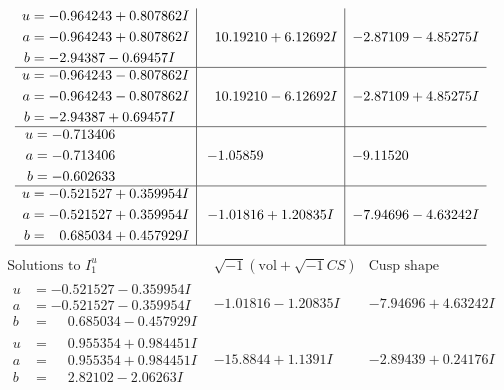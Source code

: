 \documentclass[1p]{elsarticle_modified}
\theoremstyle{definition}
\newcommand{\I}{\sqrt{-1}}
\begin{document}
$$\begin{array}{c|c|c}
\begin{aligned}
u &= -0.964243 + 0.807862 I \\
a &= -0.964243 + 0.807862 I \\
b &= -2.94387 - 0.69457 I\end{aligned}
 & \phantom{-}10.19210 + 6.12692 I & -2.87109 - 4.85275 I \\ \hline\begin{aligned}
u &= -0.964243 - 0.807862 I \\
a &= -0.964243 - 0.807862 I \\
b &= -2.94387 + 0.69457 I\end{aligned}
 & \phantom{-}10.19210 - 6.12692 I & -2.87109 + 4.85275 I \\ \hline\begin{aligned}
u &= -0.713406\phantom{ +0.000000I} \\
a &= -0.713406\phantom{ +0.000000I} \\
b &= -0.602633\phantom{ +0.000000I}\end{aligned}
 & -1.05859\phantom{ +0.000000I} & -9.11520\phantom{ +0.000000I} \\ \hline\begin{aligned}
u &= -0.521527 + 0.359954 I \\
a &= -0.521527 + 0.359954 I \\
b &= \phantom{-}0.685034 + 0.457929 I\end{aligned}
 & -1.01816 + 1.20835 I & -7.94696 - 4.63242 I\\
 \hline 
 \end{array}$$\newpage$$\begin{array}{c|c|c}  
\text{Solutions to }I^u_{1}& \I (\text{vol} + \sqrt{-1}CS) & \text{Cusp shape}\\
 \hline 
\begin{aligned}
u &= -0.521527 - 0.359954 I \\
a &= -0.521527 - 0.359954 I \\
b &= \phantom{-}0.685034 - 0.457929 I\end{aligned}
 & -1.01816 - 1.20835 I & -7.94696 + 4.63242 I \\ \hline\begin{aligned}
u &= \phantom{-}0.955354 + 0.984451 I \\
a &= \phantom{-}0.955354 + 0.984451 I \\
b &= \phantom{-}2.82102 - 2.06263 I\end{aligned}
 & -15.8844 + 1.1391 I & -2.89439 + 0.24176 I \\ \hline\begin{aligned}

\end{aligned}
\end{array}$$
\end{document}
